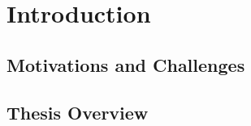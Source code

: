
\chapter{Introduction}  %

\section[Motivations and Challenges]{Motivations and Challenges}

\section[Thesis Overview]{Thesis Overview}